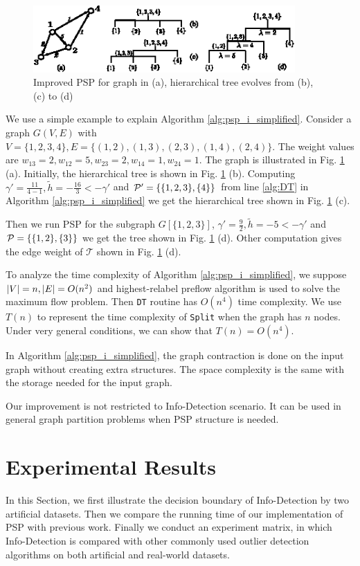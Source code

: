 \documentclass[runningheads]{llncs}
\begin{document}
\begin{figure}[!ht]
	\centering
	\includegraphics[width=10cm]{pic/alg_illustration.eps}
	\caption{Improved PSP for graph in (a), hierarchical tree evolves from (b), (c) to (d) }\label{fig:alg_eg}
\end{figure}

\begin{example}
	We use a simple example to explain Algorithm \ref{alg:psp_i_simplified}. Consider a graph $G(V, E)$ with $V=\{1,2,3,4\}, E=\{(1,2),(1,3),(2,3),(1,4),(2,4)\}$. The weight values are $w_{13}=2, w_{12}=5, w_{23}=2, w_{14}=1, w_{24}=1$. The graph is illustrated
	in Fig. \ref{fig:alg_eg} (a). Initially, the hierarchical tree is shown in Fig. \ref{fig:alg_eg} (b). Computing $\gamma' = \frac{11}{4-1}, \tilde{h} = -\frac{16}{3} < -\gamma' $ and $\P' = \{\{1,2,3\},\{4\}\}$ from line \ref {alg:DT} in Algorithm \ref{alg:psp_i_simplified} we get the hierarchical tree shown in Fig. \ref{fig:alg_eg} (c).
	
	Then we run PSP for the subgraph $G[\{1,2,3\}]$, $\gamma' = \frac{9}{2}, \tilde{h} = -5 < -\gamma'$ and $\P= \{\{1,2\},\{3\}\}$ we get the tree shown in Fig. \ref{fig:alg_eg} (d). Other computation gives the edge weight of $\mathcal{T}$ shown in Fig. \ref{fig:alg_eg} (d).
\end{example}		

To analyze the time complexity of Algorithm \ref{alg:psp_i_simplified}, we suppose $\abs{V} = n, \abs{E} = O(n^2)$ and highest-relabel preflow algorithm is used to solve the maximum flow problem. Then \texttt{DT} routine has $O(n^4)$ time complexity. 
We use $T(n)$ to represent the time complexity of \texttt{Split} when the graph has $n$ nodes. Under very general conditions, we can show that $T(n) = O(n^4)$. 

In Algorithm \ref{alg:psp_i_simplified}, the graph contraction is done on the input graph without creating extra structures. The space complexity is the same with the storage needed for the input graph. 

Our improvement is not restricted to Info-Detection scenario. It can be used in general graph partition problems when PSP structure is needed.

\section{Experimental Results}\label{sec:Experiemt}
In this Section, we first illustrate the decision boundary of Info-Detection by two artificial datasets. Then we compare the running time of our implementation of PSP with previous work. Finally we conduct an experiment matrix, in which Info-Detection is compared with other commonly used outlier detection algorithms on both artificial and real-world datasets.
\end{document}
